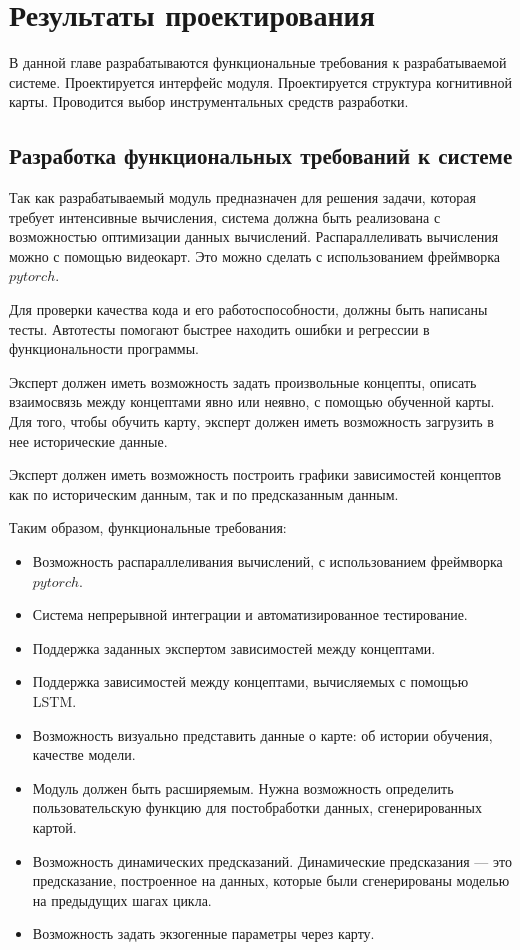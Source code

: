 \chapter{Результаты проектирования}

\begin{annotation}
	В данной главе разрабатываются функциональные требования к разрабатываемой системе.
	Проектируется интерфейс модуля. Проектируется структура когнитивной карты.
	Проводится выбор инструментальных средств разработки.
\end{annotation}


\section{Разработка функциональных требований к системе}

Так как разрабатываемый модуль предназначен для решения задачи, которая
требует интенсивные вычисления, система должна быть реализована
с возможностью оптимизации данных вычислений. Распараллеливать вычисления
можно с помощью видеокарт. Это можно сделать с использованием фреймворка $ pytorch $.

Для проверки качества кода и его работоспособности, должны быть написаны тесты.
Автотесты помогают быстрее находить ошибки и регрессии в функциональности программы.

Эксперт должен иметь возможность задать произвольные концепты, описать
взаимосвязь между концептами явно или неявно, с помощью обученной карты.
Для того, чтобы обучить карту, эксперт должен иметь возможность загрузить
в нее исторические данные.

Эксперт должен иметь возможность построить графики зависимостей концептов
как по историческим данным, так и по предсказанным данным.

Таким образом, функциональные требования:
\begin{itemize}
	\item Возможность распараллеливания вычислений, с использованием фреймворка $pytorch$.
	\item Система непрерывной интеграции и автоматизированное тестирование.
	\item Поддержка заданных экспертом зависимостей между концептами.
	\item Поддержка зависимостей между концептами, вычисляемых с помощью LSTM.
	\item Возможность визуально представить данные о карте: об истории обучения, качестве модели.
	\item Модуль должен быть расширяемым. Нужна возможность определить пользовательскую функцию для постобработки данных, сгенерированных картой.
	\item Возможность динамических предсказаний. Динамические предсказания --- это
	предсказание, построенное на данных, которые были сгенерированы моделью на предыдущих шагах цикла.
	\item Возможность задать экзогенные параметры через карту.
\end{itemize}


